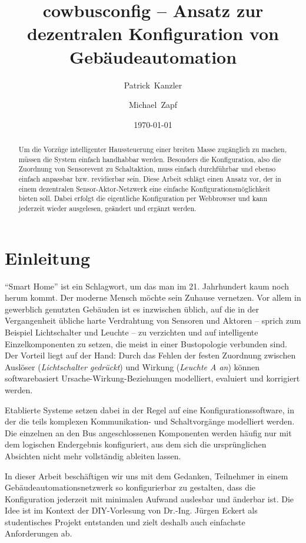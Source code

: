 \documentclass{IEEEtran}
\begin{document}
\title{cowbusconfig -- Ansatz zur dezentralen Konfiguration von Gebäudeautomation}
\author{Patrick~Kanzler \and Michael~Zapf}
\date{\today}



\maketitle

\begin{abstract}
    Um die Vorzüge intelligenter Haussteuerung einer breiten Masse zugänglich
    zu machen, müssen die System einfach handhabbar werden.
    Besonders die Konfiguration, also die Zuordnung von Sensorevent zu
    Schaltaktion, muss einfach durchführbar und ebenso einfach anpassbar
    bzw. revidierbar sein. Diese Arbeit schlägt einen Ansatz vor,
    der in einem dezentralen Sensor-Aktor-Netzwerk eine einfache
    Konfigurationsmöglichkeit bieten soll.
    Dabei erfolgt die eigentliche Konfiguration per Webbrowser und kann
    jederzeit wieder ausgelesen, geändert und ergänzt werden.
\end{abstract}

\section{Einleitung}
    \enquote{Smart Home} ist ein Schlagwort, um das man im 21. Jahrhundert
    kaum noch herum kommt. Der moderne Mensch möchte sein Zuhause vernetzen.
    Vor allem in gewerblich genutzten Gebäuden ist es inzwischen üblich,
    auf die in der Vergangenheit übliche harte Verdrahtung von Sensoren und
    Aktoren -- sprich zum Beispiel Lichtschalter und Leuchte -- zu verzichten
    und auf intelligente Einzelkomponenten zu setzen, die meist in einer
    Bustopologie verbunden sind. Der Vorteil liegt auf der Hand:
    Durch das Fehlen der festen Zuordnung zwischen Auslöser
    (\emph{Lichtschalter gedrückt}) und Wirkung (\emph{Leuchte A an})
    können softwarebasiert Ursache-Wirkung-Beziehungen modelliert, evaluiert
    und korrigiert werden.

    Etablierte Systeme setzen dabei in der Regel auf eine
    Konfigurationssoftware, in der die teils komplexen Kommunikation- und
    Schaltvorgänge modelliert werden.
    Die einzelnen an den Bus angeschlossenen Komponenten werden häufig nur
    mit dem logischen Endergebnis konfiguriert,
    aus dem sich die ursprünglichen Absichten nicht mehr vollständig ableiten
    lassen.

    In dieser Arbeit beschäftigen wir uns mit dem Gedanken,
    Teilnehmer in einem Gebäudeautomationsnetzwerk so konfigurierbar zu gestalten,
    dass die Konfiguration jederzeit mit minimalen Aufwand auslesbar
    und änderbar ist.
    Die Idee ist im Kontext der DIY-Vorlesung von Dr.-Ing. Jürgen Eckert als studentisches
    Projekt entstanden und zielt deshalb auch einfachste Anforderungen ab.
\end{document}
